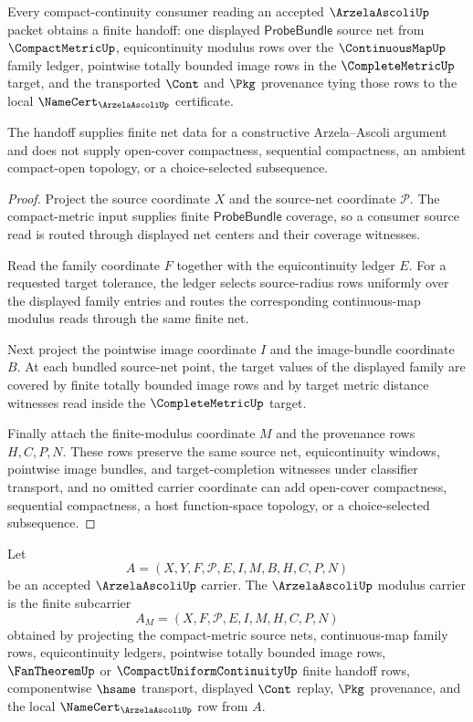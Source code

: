 \begin{theorem}
\label{thm:arzela-ascoli-equicontinuity-net-handoff}
Every compact-continuity consumer reading an accepted $\ArzelaAscoliUp$ packet obtains a finite handoff: one displayed $\mathsf{ProbeBundle}$ source net from $\CompactMetricUp$, equicontinuity modulus rows over the $\ContinuousMapUp$ family ledger, pointwise totally bounded image rows in the $\CompleteMetricUp$ target, and the transported $\Cont$ and $\Pkg$ provenance tying those rows to the local $\NameCert_{\ArzelaAscoliUp}$ certificate.

The handoff supplies finite net data for a constructive Arzela--Ascoli argument and does not supply open-cover compactness, sequential compactness, an ambient compact-open topology, or a choice-selected subsequence.
\end{theorem}
\begin{proof}
Project the source coordinate $X$ and the source-net coordinate $\mathcal{P}$. The compact-metric input supplies finite $\mathsf{ProbeBundle}$ coverage, so a consumer source read is routed through displayed net centers and their coverage witnesses.

Read the family coordinate $F$ together with the equicontinuity ledger $E$. For a requested target tolerance, the ledger selects source-radius rows uniformly over the displayed family entries and routes the corresponding continuous-map modulus reads through the same finite net.

Next project the pointwise image coordinate $I$ and the image-bundle coordinate $B$. At each bundled source-net point, the target values of the displayed family are covered by finite totally bounded image rows and by target metric distance witnesses read inside the $\CompleteMetricUp$ target.

Finally attach the finite-modulus coordinate $M$ and the provenance rows $H,C,P,N$. These rows preserve the same source net, equicontinuity windows, pointwise image bundles, and target-completion witnesses under classifier transport, and no omitted carrier coordinate can add open-cover compactness, sequential compactness, a host function-space topology, or a choice-selected subsequence.
\end{proof}

\begin{definition}
\label{def:arzela-ascoli-modulus-carrier}
Let
$$
A=(X,Y,F,\mathcal{P},E,I,M,B,H,C,P,N)
$$
be an accepted $\ArzelaAscoliUp$ carrier. The $\ArzelaAscoliUp$ modulus carrier is the finite subcarrier
$$
A_M=(X,F,\mathcal{P},E,I,M,H,C,P,N)
$$
obtained by projecting the compact-metric source nets, continuous-map family rows, equicontinuity ledgers, pointwise totally bounded image rows, $\FanTheoremUp$ or $\CompactUniformContinuityUp$ finite handoff rows, componentwise $\hsame$ transport, displayed $\Cont$ replay, $\Pkg$ provenance, and the local $\NameCert_{\ArzelaAscoliUp}$ row from $A$.
\end{definition}

